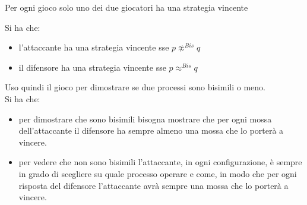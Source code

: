 \begin{definizione}
  Per ogni gioco solo uno dei due giocatori ha una strategia vincente
\end{definizione} \vspace{5mm} %
\begin{definizione}
  Si ha che:
  \begin{itemize}
    \item l'attaccante ha una strategia vincente sse $p\not\approx^{Bis}q$
    \item il difensore ha una strategia vincente sse $p\approx^{Bis}q$
  \end{itemize}
\end{definizione} \vspace{5mm} %
Uso quindi il gioco per dimostrare se due processi sono bisimili o meno.\\
Si ha che:
\begin{itemize}
  \item per dimostrare che sono bisimili bisogna mostrare che per ogni mossa
  dell'attaccante il difensore ha sempre almeno una mossa che lo porterà a
  vincere.
  
  \item per vedere che non sono bisimili l'attaccante, in ogni configurazione, è
  sempre in grado di scegliere su quale processo operare e come, in modo che per
  ogni risposta del difensore l'attaccante avrà sempre una mossa che lo porterà
  a vincere. 
\end{itemize}

